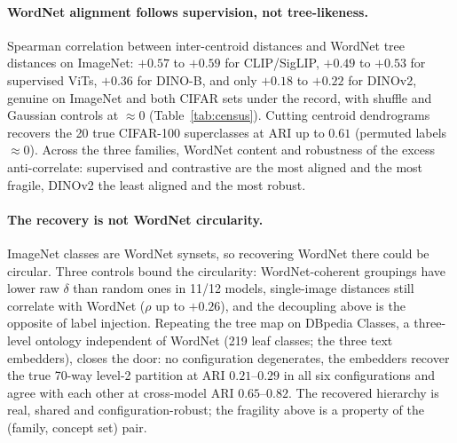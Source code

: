 \paragraph{WordNet alignment follows supervision, not tree-likeness.} Spearman correlation between inter-centroid distances and WordNet tree distances on ImageNet: $+0.57$ to $+0.59$ for CLIP/SigLIP, $+0.49$ to $+0.53$ for supervised ViTs, $+0.36$ for DINO-B, and only $+0.18$ to $+0.22$ for DINOv2, genuine on ImageNet and both CIFAR sets under the record, with shuffle and Gaussian controls at $\approx0$ (Table~\ref{tab:census}). Cutting centroid dendrograms recovers the 20 true CIFAR-100 superclasses at ARI up to $0.61$ (permuted labels $\approx0$). Across the three families, WordNet content and robustness of the excess anti-correlate: supervised and contrastive are the most aligned and the most fragile, DINOv2 the least aligned and the most robust. %

\paragraph{The recovery is not WordNet circularity.} ImageNet classes are WordNet synsets, so recovering WordNet there could be circular. Three controls bound the circularity: WordNet-coherent groupings have lower raw $\delta$ than random ones in 11/12 models, single-image distances still correlate with WordNet ($\rho$ up to $+0.26$), and the decoupling above is the opposite of label injection. Repeating the tree map on DBpedia Classes, a three-level ontology independent of WordNet (219 leaf classes; the three text embedders), closes the door: no configuration degenerates, the embedders recover the true 70-way level-2 partition at ARI $0.21$--$0.29$ in all six configurations and agree with each other at cross-model ARI $0.65$--$0.82$. The recovered hierarchy is real, shared and configuration-robust; the fragility above is a property of the (family, concept set) pair. %

